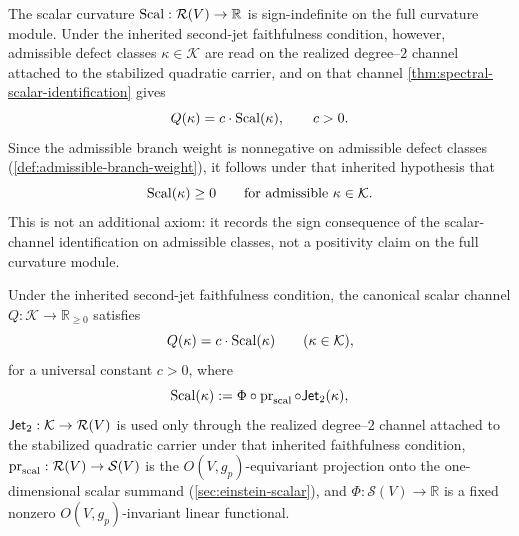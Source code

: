 \begin{remark}
\label{rem:scal-sign}
The scalar curvature $\operatorname{Scal} : \mathcal R(V) \to \mathbb R$ is
sign-indefinite on the full curvature module.
Under the inherited second-jet faithfulness condition, however,
admissible defect classes $\kappa\in\mathcal K$ are read on the
realized degree--\(2\) channel attached to the stabilized quadratic
carrier, and on that channel
\cref{thm:spectral-scalar-identification} gives
\[
  Q(\kappa) = c \cdot \operatorname{Scal}(\kappa),
  \qquad c>0.
\]
Since the admissible branch weight is nonnegative on admissible defect
classes (\cref{def:admissible-branch-weight}), it follows under that
inherited hypothesis that
\[
  \operatorname{Scal}(\kappa) \ge 0
  \qquad \text{for admissible } \kappa \in \mathcal K.
\]
This is not an additional axiom: it records the sign consequence of
the scalar-channel identification on admissible classes, not
a positivity claim on the full curvature module.
\end{remark}

\begin{theorem}
\label{thm:spectral-scalar-identification}
Under the inherited second-jet faithfulness condition, the canonical
scalar channel
$Q : \mathcal K \to \mathbb R_{\geq 0}$ satisfies
\[
  Q(\kappa) = c \cdot \operatorname{Scal}(\kappa)
  \qquad (\kappa \in \mathcal K),
\]
for a universal constant $c > 0$, where
\[
  \operatorname{Scal}(\kappa) := \Phi \circ \operatorname{pr}_{\mathrm{scal}} \circ \mathsf{Jet}_2(\kappa),
\]
$\mathsf{Jet}_2 : \mathcal K \to \mathcal R(V)$ is used only through
the realized degree--\(2\) channel attached to the stabilized
quadratic carrier under that inherited faithfulness condition,
$\operatorname{pr}_{\mathrm{scal}} : \mathcal R(V) \to \mathcal S(V)$ is the
$O(V,g_p)$-equivariant projection onto the one-dimensional scalar
summand (\cref{sec:einstein-scalar}), and
$\Phi : \mathcal S(V) \to \mathbb R$ is a fixed nonzero $O(V,g_p)$-invariant
linear functional.
\end{theorem}

